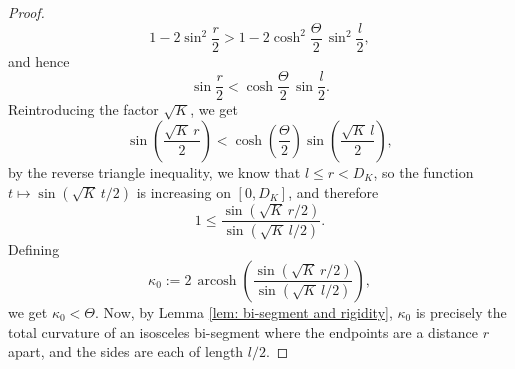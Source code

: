\documentclass[10pt,a4paper]{amsart}
\DeclareMathOperator{\arcosh}{arcosh}
\begin{document}
\begin{proof}
\begin{equation*}
1-2\sin^2\frac{r}{2}
>
1-2\cosh^2\frac{\Theta}{2}\,\sin^2\frac{l}{2},
\end{equation*}
and hence
\begin{equation*}
\sin\frac{r}{2}<
\cosh\frac{\Theta}{2}\,\sin\frac{l}{2}.
\end{equation*}
Reintroducing the factor $\sqrt K$, we get
\begin{equation*}
\sin\left(\frac{\sqrt K\,r}{2}\right)<\cosh\left(\frac{\Theta}{2}\right)
\sin\left(\frac{\sqrt K\,l}{2}\right),
\end{equation*}
by the reverse triangle inequality, we know that $l\leq r<D_K$, so the function $t\mapsto \sin(\sqrt K\,t/2)$ is increasing on
$[0,D_K]$, and therefore
\begin{equation*}
1\leq\frac{\sin(\sqrt K\,r/2)}{\sin(\sqrt K\,l/2)}.
\end{equation*}
Defining
\begin{equation*}
\kappa_0:=2\,\arcosh\left(
\frac{\sin(\sqrt K\,r/2)}{\sin(\sqrt K\,l/2)}\right),
\end{equation*}
we get $\kappa_0< \Theta$. 
Now, by Lemma \ref{lem: bi-segment and rigidity}, $\kappa_0$ is precisely the total curvature of an isosceles bi-segment where the endpoints are a distance $r$ apart, and the sides are each of length $l/2$. \qedhere


\end{proof}
\end{document}
